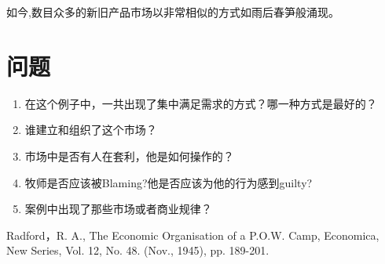 \documentclass[10pt, a4paper]{ctexart} %
\begin{document}
如今,数目众多的新旧产品市场以非常相似的方式如雨后春笋般涌现。




\section*{问题}
\begin{enumerate}
	\item 在这个例子中，一共出现了集中满足需求的方式？哪一种方式是最好的？
	\item 谁建立和组织了这个市场？
	\item 市场中是否有人在套利，他是如何操作的？
	\item 牧师是否应该被Blaming?他是否应该为他的行为感到guilty?
	\item 案例中出现了那些市场或者商业规律？
\end{enumerate}




\small
\begin{thebibliography}{99}
	\setlength{\parskip}{0pt} %
	 Radford，R. A., The Economic Organisation of a P.O.W. Camp, Economica, New Series, Vol. 12, No. 48. (Nov., 1945), pp. 189-201.
	\end {thebibliography}
\end{document}
